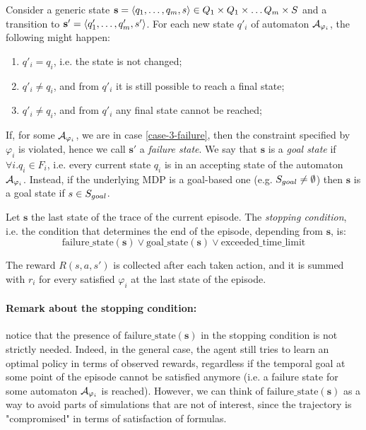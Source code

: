 Consider a generic state $\mathbf{s}=\langle q_1, \dots, q_m, s \rangle\in Q_1\times Q_1\times \dots Q_m \times S$ and a transition to $\mathbf{s'}=\langle q'_1, \dots, q'_m, s' \rangle$. For each new state $q'_i$ of automaton $\mathcal{A}_{\varphi_i}$, the following might happen:
\begin{enumerate}
	\item $q'_i = q_i$, i.e. the state is not changed;\label{case-1-nochange}
	\item $q'_i \neq q_i$, and from $q'_i$ it is still possible to reach a final state;\label{case-2-change}
	\item $q'_i \neq q_i$, and from $q'_i$ any final state cannot be reached;\label{case-3-failure}
\end{enumerate}
If, for some $\mathcal{A}_{\varphi_i}$, we are in case \ref{case-3-failure}, then the constraint specified by $\varphi_i$ is violated, hence we call $\mathbf{s'}$ a \emph{failure state}. We say that $\mathbf{s}$ is a \emph{goal state} if $\forall i. q_i \in F_i$, i.e. every current state $q_i$ is in an accepting state of the automaton $\mathcal{A}_{\varphi_i}$. Instead, if the underlying MDP is a goal-based one (e.g. $S_{goal}\neq \emptyset$) then $\mathbf{s}$ is a goal state if $s\in S_{goal}$.

Let $\mathbf{s}$ the last state of the trace of the current episode. The \emph{stopping condition}, i.e. the condition that determines the end of the episode, depending from $\mathbf{s}$, is:
$$
\mathrm{failure\_state}(\mathbf{s}) \vee \mathrm{goal\_state}(\mathbf{s}) \vee \mathrm{exceeded\_time\_limit}
$$

The reward $R(s,a,s')$ is collected after each taken action, and it is summed with $r_i$ for every satisfied $\varphi_i$ at the last state of the episode.

\paragraph{Remark about the stopping condition:} notice that the presence of $\mathrm{failure\_state}(\mathbf{s})$ in the stopping condition is not strictly needed. Indeed, in the general case, the agent still tries to learn an optimal policy in terms of observed rewards, regardless if the temporal goal at some point of the episode cannot be satisfied anymore (i.e. a failure state for some automaton $\mathcal{A}_{\varphi_i}$ is reached). However, we can think of $\mathrm{failure\_state}(\mathbf{s})$ as a way to avoid parts of simulations that are not of interest, since the trajectory is "compromised" in terms of satisfaction of \LLf formulas.

